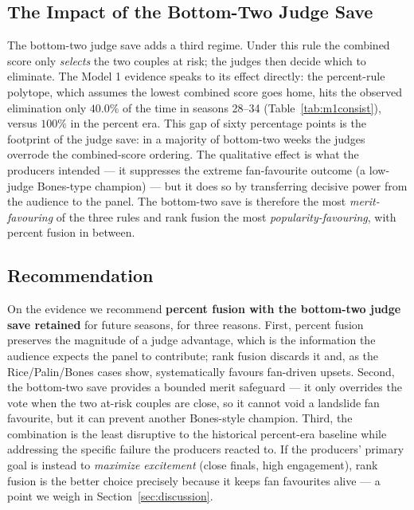\documentclass{article}
\begin{document}
\subsection{The Impact of the Bottom-Two Judge Save}

The bottom-two judge save adds a third regime. Under this rule the combined score only
\emph{selects} the two couples at risk; the judges then decide which to eliminate. The
Model 1 evidence speaks to its effect directly: the percent-rule polytope, which assumes the
lowest combined score goes home, hits the observed elimination only $\mathbf{40.0\%}$ of the
time in seasons 28--34 (Table~\ref{tab:m1consist}), versus $100\%$ in the percent era. This
gap of sixty percentage points is the footprint of the judge save: in a majority of
bottom-two weeks the judges overrode the combined-score ordering. The qualitative effect is
what the producers intended --- it suppresses the extreme fan-favourite outcome (a low-judge
Bones-type champion) --- but it does so by transferring decisive power from the audience to
the panel. The bottom-two save is therefore the most \emph{merit-favouring} of the three
rules and rank fusion the most \emph{popularity-favouring}, with percent fusion in between.

\subsection{Recommendation}

On the evidence we recommend \textbf{percent fusion with the bottom-two judge save retained}
for future seasons, for three reasons. First, percent fusion preserves the magnitude of a
judge advantage, which is the information the audience expects the panel to contribute;
rank fusion discards it and, as the Rice/Palin/Bones cases show, systematically favours
fan-driven upsets. Second, the bottom-two save provides a bounded merit safeguard --- it
only overrides the vote when the two at-risk couples are close, so it cannot void a
landslide fan favourite, but it can prevent another Bones-style champion. Third, the
combination is the least disruptive to the historical percent-era baseline while addressing
the specific failure the producers reacted to. If the producers' primary goal is instead to
\emph{maximize excitement} (close finals, high engagement), rank fusion is the better choice
precisely because it keeps fan favourites alive --- a point we weigh in
Section~\ref{sec:discussion}.

\end{document}
